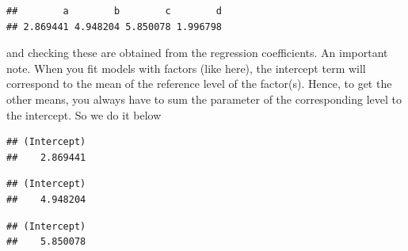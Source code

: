\documentclass[
]{book}
\newenvironment{Shaded}{\begin{snugshade}}{\end{snugshade}}
\newcommand{\CommentTok}[1]{\textcolor[rgb]{0.56,0.35,0.01}{\textit{#1}}}
\newcommand{\DecValTok}[1]{\textcolor[rgb]{0.00,0.00,0.81}{#1}}
\newcommand{\NormalTok}[1]{#1}
\newcommand{\OperatorTok}[1]{\textcolor[rgb]{0.81,0.36,0.00}{\textbf{#1}}}
\begin{document}
\begin{verbatim}
##        a        b        c        d 
## 2.869441 4.948204 5.850078 1.996798
\end{verbatim}

and checking these are obtained from the regression coefficients.
An important note. When you fit models with factors (like here), the intercept term will correspond to the mean of the reference level of the factor(s). Hence, to get the other means, you always have to sum the parameter of the corresponding level to the intercept. So we do it below

\begin{Shaded}
\end{Shaded}

\begin{verbatim}
## (Intercept) 
##    2.869441
\end{verbatim}

\begin{Shaded}
\end{Shaded}

\begin{verbatim}
## (Intercept) 
##    4.948204
\end{verbatim}

\begin{Shaded}
\end{Shaded}

\begin{verbatim}
## (Intercept) 
##    5.850078
\end{verbatim}

\begin{Shaded}
\end{Shaded}
\end{document}
